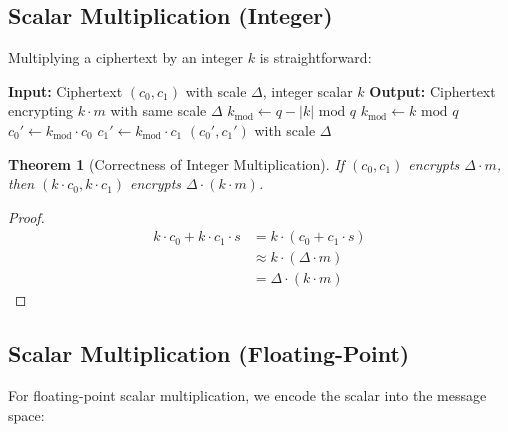 \documentclass[11pt,a4paper]{article}
\newtheorem{theorem}{Theorem}
\newcommand{\bmod}{\text{ mod }}
\begin{document}
\subsection{Scalar Multiplication (Integer)}

Multiplying a ciphertext by an integer $k$ is straightforward:

\begin{algorithm}[H]
\caption{Integer Scalar Multiplication}
\begin{algorithmic}[1]
    \State \textbf{Input:} Ciphertext $(c_0, c_1)$ with scale $\Delta$, integer scalar $k$
    \State \textbf{Output:} Ciphertext encrypting $k \cdot m$ with same scale $\Delta$
    \State
    \State {}
        \State $k_{\text{mod}} \gets q - |k| \bmod q$ 
    \Else
        \State $k_{\text{mod}} \gets k \bmod q$
    \EndIf
    \State
    \State $c_0' \gets k_{\text{mod}} \cdot c_0$
    \State $c_1' \gets k_{\text{mod}} \cdot c_1$
    \State
    \State \Return $(c_0', c_1')$ with scale $\Delta$
\EndFunction
\end{algorithmic}
\end{algorithm}

\begin{theorem}[Correctness of Integer Multiplication]
If $(c_0, c_1)$ encrypts $\Delta \cdot m$, then $(k \cdot c_0, k \cdot c_1)$ encrypts $\Delta \cdot (k \cdot m)$.
\end{theorem}

\begin{proof}
\begin{align*}
k \cdot c_0 + k \cdot c_1 \cdot s &= k \cdot (c_0 + c_1 \cdot s) \\
&\approx k \cdot (\Delta \cdot m) \\
&= \Delta \cdot (k \cdot m)
\end{align*}
\end{proof}

\subsection{Scalar Multiplication (Floating-Point)}

For floating-point scalar multiplication, we encode the scalar into the message space:
\end{document}

